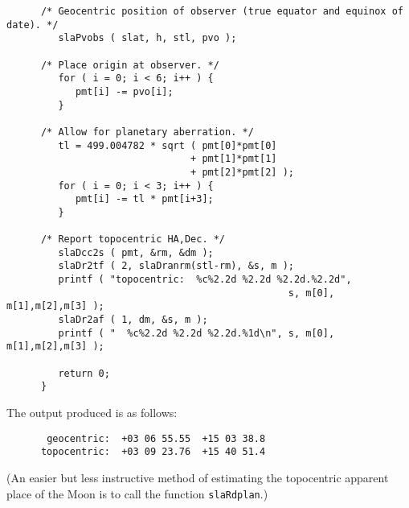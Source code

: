 \documentclass[11pt,fleqn,twoside]{article}
\renewcommand{\_}{{\tt\char'137}}     %
\begin{document}
\begin{verbatim}
      /* Geocentric position of observer (true equator and equinox of date). */
         slaPvobs ( slat, h, stl, pvo );

      /* Place origin at observer. */
         for ( i = 0; i < 6; i++ ) {
            pmt[i] -= pvo[i];
         }

      /* Allow for planetary aberration. */
         tl = 499.004782 * sqrt ( pmt[0]*pmt[0]
                                + pmt[1]*pmt[1]
                                + pmt[2]*pmt[2] );
         for ( i = 0; i < 3; i++ ) {
            pmt[i] -= tl * pmt[i+3];
         }

      /* Report topocentric HA,Dec. */
         slaDcc2s ( pmt, &rm, &dm );
         slaDr2tf ( 2, slaDranrm(stl-rm), &s, m );
         printf ( "topocentric:  %c%2.2d %2.2d %2.2d.%2.2d",
                                                 s, m[0], m[1],m[2],m[3] );
         slaDr2af ( 1, dm, &s, m );
         printf ( "  %c%2.2d %2.2d %2.2d.%1d\n", s, m[0], m[1],m[2],m[3] );

         return 0;
      }
\end{verbatim}
\vspace{-3ex}
\goodbreak
The output produced is as follows:
\goodbreak
\begin{verbatim}
       geocentric:  +03 06 55.55  +15 03 38.8
      topocentric:  +03 09 23.76  +15 40 51.4
\end{verbatim}
\goodbreak
(An easier but
less instructive method of estimating the topocentric apparent place of the
Moon is to call the function
{\tt slaRdplan}.)
\end{document}
